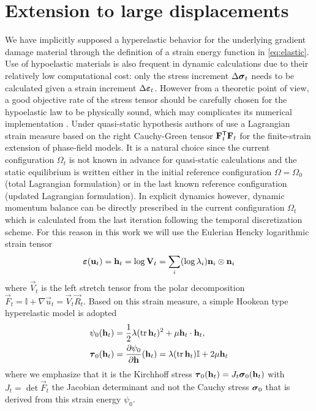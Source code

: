 \section{Extension to large displacements}
We have implicitly supposed a hyperelastic behavior for the underlying gradient damage material through the definition of a strain energy function in \eqref{eq:elastic}. Use of hypoelastic materials is also frequent in dynamic calculations due to their relatively low computational cost: only the stress increment $\Delta\sig_t$ needs to be calculated given a strain increment $\Delta\eps_t$. However from a theoretic point of view, a good objective rate of the stress tensor should be carefully chosen for the hypoelastic law to be physically sound, which may complicates its numerical implementation \cite{SimoPister:1984}. Under quasi-static hypothesis authors of \cite{PieroLancioniMarch:2007,MieheSchaenzelUlmer:2015} use a Lagrangian strain measure based on the right Cauchy-Green tensor $\vec{F}_t^\mT\vec{F}_t$ for the finite-strain extension of phase-field models. It is a natural choice since the current configuration $\Omega_t$ is not known in advance for quasi-static calculations and the static equilibrium is written either in the initial reference configuration $\Omega=\Omega_0$ (total Lagrangian formulation) or in the last known reference configuration (updated Lagrangian formulation). In explicit dynamics however, dynamic momentum balance can be directly prescribed in the current configuration $\Omega_t$ which is calculated from the last iteration following the temporal discretization scheme. For this reason in this work we will use the Eulerian Hencky logarithmic strain tensor \cite{XiaoBruhnsMeyers:1997}
\begin{equation} \label{eq:logstrain}
\eps(\vec{u}_t)=\vec{h}_t=\log\vec{V}_t=\sum_i(\log\lambda_i)\vec{n}_i\otimes\vec{n}_i
\end{equation}
where $\vec{V}_t$ is the left stretch tensor from the polar decomposition $\vec{F}_t=\mathbb{I}+\nabla\vec{u}_t=\vec{V}_t\vec{R}_t$. Based on this strain measure, a simple Hookean type hyperelastic model \cite{XiaoChen:2002} is adopted
\begin{align}
\psi_0(\vec{h}_t) &= \frac{1}{2}\lambda(\tr\vec{h}_t)^2+\mu\vec{h}_t\cdot\vec{h}_t, \label{eq:soundpsi} \\
\vtau_0(\vec{h}_t) &= \frac{\partial\psi_0}{\partial\vec{h}}(\vec{h}_t)=\lambda(\tr\vec{h}_t)\mathbb{I}+2\mu\vec{h}_t \label{eq:henckystress}
\end{align}
where we emphasize that it is the Kirchhoff stress $\vtau_0(\vec{h}_t)=J_t\sig_0(\vec{h}_t)$ with $J_t=\det\vec{F}_t$ the Jacobian determinant and not the Cauchy stress $\sig_0$ that is derived from this strain energy $\psi_0$.


